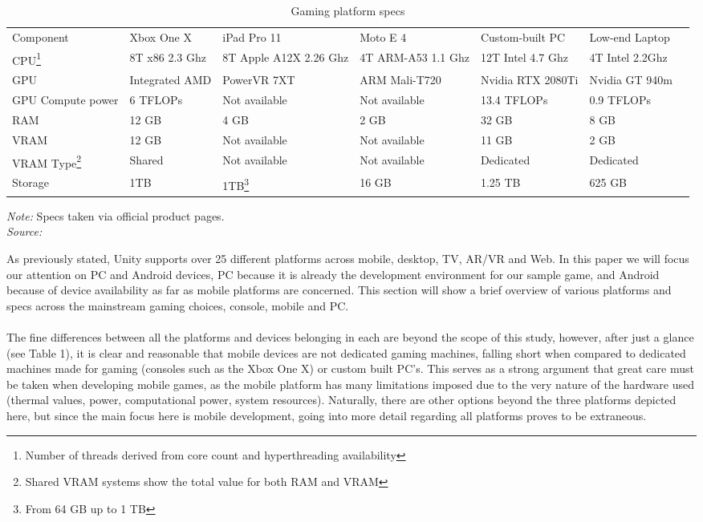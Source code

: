 \begin{table*}[t]
\caption{Gaming platform specs}
\label{tab:conf}
\begin{minipage}{\textwidth}
\begin{center}
\begin{tabular}{lllllll}
Component & Xbox One X & iPad Pro 11 & Moto E 4 & Custom-built PC & Low-end Laptop \\
CPU\footnote{Number of threads derived from core count and hyperthreading availability} & 8T x86 2.3 Ghz & 8T Apple A12X 2.26 Ghz & 4T ARM-A53 1.1 Ghz & 12T Intel 4.7 Ghz & 4T Intel 2.2Ghz \\
GPU & Integrated AMD & PowerVR 7XT & ARM Mali-T720 & Nvidia RTX 2080Ti & Nvidia GT 940m \\
GPU Compute power & 6 TFLOPs &  Not available &  Not available & 13.4 TFLOPs & 0.9 TFLOPs \\
RAM & 12 GB & 4 GB & 2 GB  & 32 GB & 8 GB \\
VRAM & 12 GB & Not available &  Not available & 11 GB & 2 GB \\
VRAM Type\footnote{Shared VRAM systems show the total value for both RAM and VRAM} & Shared &  Not available &  Not available & Dedicated & Dedicated \\
Storage & 1TB & 1TB\footnote{From 64 GB up to 1 TB} & 16 GB & 1.25 TB & 625 GB
\end{tabular}
\bigskip
\footnotesize\emph{Note:} Specs taken via official product pages. \\
\emph{Source:}\cite{rtxspecs} \cite{motospecs} \cite{xboxspecs} \cite{laptopspecs} \cite{intelspecs} 
\end{center} 
\end{minipage}
\end{table*}
As previously stated, Unity supports over 25  different platforms across mobile, desktop, TV, AR/VR and Web. In this paper we will focus our attention on PC and Android devices, PC because it is already the development environment for our sample game, and Android because of device availability as far as mobile platforms are concerned. This section will show a brief overview of various platforms and specs across the mainstream gaming choices, console, mobile and PC. \\ \\
The fine differences between all the platforms and devices belonging in each are beyond the scope of this study, however, after just a glance (see Table 1), it is clear and reasonable that mobile devices are not dedicated gaming machines, falling short when compared to dedicated machines made for gaming (consoles such as the Xbox One X) or custom built PC's. This serves as a strong argument that great care must be taken when developing mobile games, as the mobile platform has many limitations imposed due to the very nature of the hardware used (thermal values, power, computational power, system resources). Naturally, there are other options beyond the three platforms depicted here, but since the main focus here is mobile development, going into more detail regarding all platforms proves to be extraneous.